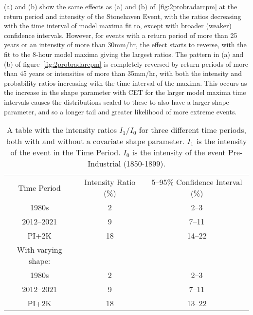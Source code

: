 (a) and (b) show the same effects as (a) and (b) of~\ref{fig:2probradarcpm} at the return period and intensity
    of the Stonehaven Event,
    with the ratios decreasing with the time interval of model maxima fit to,
    except with broader (weaker) confidence intervals.
However,
    for events with a return period of more than 25 years or an intensity of more than 30mm/hr,
    the effect starts to reverse,
    with the fit to the 8-hour model maxima giving the largest ratios.
The pattern in (a) and (b) of figure~\ref{fig:2probradarcpm} is completely reversed by return periods of
    more than 45 years or intensities of more than 35mm/hr,
    with both the intensity and probability ratios increasing with the time interval of the maxima.
This occurs as the increase in the shape parameter with CET for the larger model maxima time intervals causes the
    distributions scaled to these to also have a larger shape parameter,
    and so a longer tail and greater likelihood of more extreme events.

\begin{table}[H]
   \centering
    \begin{tabular}{c c c}
        Time Period & Intensity Ratio (\%) & 5--95\% Confidence Interval (\%) \\
        1980s & 2 & 2--3 \\
        2012--2021 & 9 & 7--11 \\
        PI+2K & 18 & 14--22 \\
        With varying shape: && \\
        1980s & 2 & 2--3 \\
        2012--2021 & 9 & 7--11 \\
        PI+2K & 18 & 13--22 \\
    \end{tabular}
    \caption{A table with the intensity ratios $I_1/I_0$ for three different time periods,
        both with and without a covariate shape parameter.
    $I_1$ is the intensity of the event in the Time Period.
    $I_0$ is the intensity of the event Pre-Industrial (1850-1899).}
    \label{tab:irtable}
\end{table}

